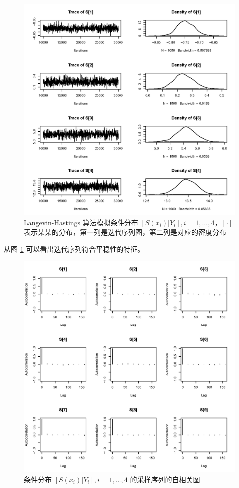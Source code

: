 \documentclass[12pt,a4paper,UTF8,twoside]{book}
\theoremstyle{definition}
\theoremstyle{definition}
\theoremstyle{definition}
\theoremstyle{remark}
\begin{document}
\begin{figure}

{\centering \includegraphics[width=0.7\linewidth]{figures/rongelap-mcml-diagnosis-trace-9} 

}

\caption{Langevin-Hastings 算法模拟条件分布
\([S(x_{i})|Y_{i}], i = 1,\ldots,4\)，\([\cdot]\)
表示某某的分布，第一列是迭代序列图，第二列是对应的密度分布}\label{fig:rongelap-trace-plot}
\end{figure}

从图 \ref{fig:rongelap-trace-plot} 可以看出迭代序列符合平稳性的特征。

\begin{figure}

{\centering \includegraphics[width=0.7\linewidth]{figures/rongelap-mcml-diagnosis-acf-9} 

}

\caption{条件分布 \([S(x_{i})|Y_{i}], i = 1, \ldots, 4\)
的采样序列的自相关图}\label{fig:rongelap-acf-plot}
\end{figure}
\end{document}
